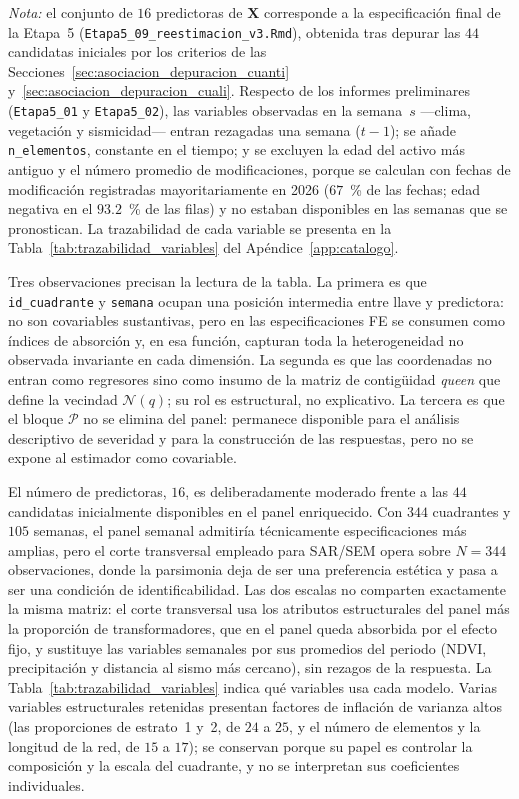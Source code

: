 \begin{table}[!htbp]
\noindent\textit{Nota:} el conjunto de $16$ predictoras de $\mathbf{X}$ corresponde a la especificación final de la Etapa~5 (\texttt{Etapa5\_09\_reestimacion\_v3.Rmd}), obtenida tras depurar las $44$ candidatas iniciales por los criterios de las Secciones~\ref{sec:asociacion_depuracion_cuanti} y~\ref{sec:asociacion_depuracion_cuali}. Respecto de los informes preliminares (\texttt{Etapa5\_01} y \texttt{Etapa5\_02}), las variables observadas en la semana~$s$ ---clima, vegetación y sismicidad--- entran rezagadas una semana ($t-1$); se añade \texttt{n\_elementos}, constante en el tiempo; y se excluyen la edad del activo más antiguo y el número promedio de modificaciones, porque se calculan con fechas de modificación registradas mayoritariamente en 2026 ($67$~\% de las fechas; edad negativa en el $93{.}2$~\% de las filas) y no estaban disponibles en las semanas que se pronostican. La trazabilidad de cada variable se presenta en la Tabla~\ref{tab:trazabilidad_variables} del Apéndice~\ref{app:catalogo}.
\end{table}

Tres observaciones precisan la lectura de la tabla. La primera es que \texttt{id\_cuadrante} y \texttt{semana} ocupan una posición intermedia entre llave y predictora: no son covariables sustantivas, pero en las especificaciones FE se consumen como índices de absorción y, en esa función, capturan toda la heterogeneidad no observada invariante en cada dimensión. La segunda es que las coordenadas no entran como regresores sino como insumo de la matriz de contigüidad \emph{queen} que define la vecindad $\mathcal{N}(q)$; su rol es estructural, no explicativo. La tercera es que el bloque $\mathcal{P}$ no se elimina del panel: permanece disponible para el análisis descriptivo de severidad y para la construcción de las respuestas, pero no se expone al estimador como covariable.

El número de predictoras, $16$, es deliberadamente moderado frente a las $44$ candidatas inicialmente disponibles en el panel enriquecido. Con $344$ cuadrantes y $105$ semanas, el panel semanal admitiría técnicamente especificaciones más amplias, pero el corte transversal empleado para SAR/SEM opera sobre $N=344$ observaciones, donde la parsimonia deja de ser una preferencia estética y pasa a ser una condición de identificabilidad. Las dos escalas no comparten exactamente la misma matriz: el corte transversal usa los atributos estructurales del panel más la proporción de transformadores, que en el panel queda absorbida por el efecto fijo, y sustituye las variables semanales por sus promedios del periodo (NDVI, precipitación y distancia al sismo más cercano), sin rezagos de la respuesta. La Tabla~\ref{tab:trazabilidad_variables} indica qué variables usa cada modelo. Varias variables estructurales retenidas presentan factores de inflación de varianza altos (las proporciones de estrato~1 y~2, de $24$ a $25$, y el número de elementos y la longitud de la red, de $15$ a $17$); se conservan porque su papel es controlar la composición y la escala del cuadrante, y no se interpretan sus coeficientes individuales.

